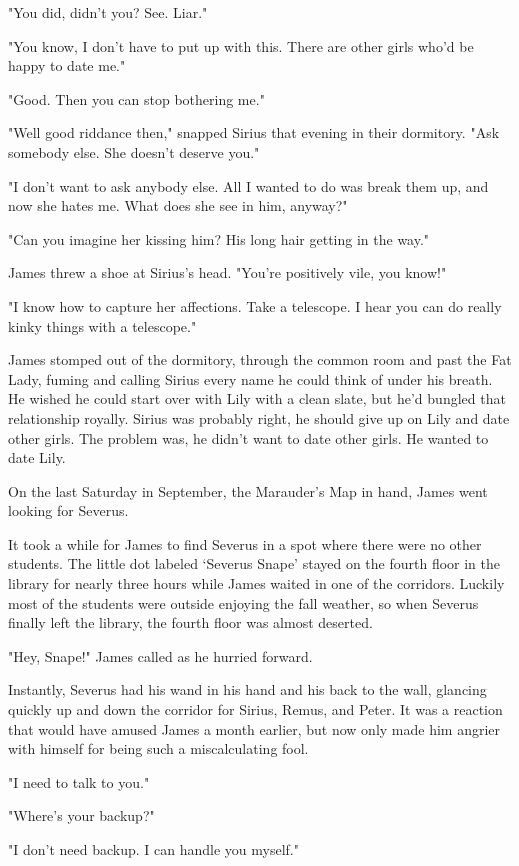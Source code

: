 "You did, didn't you? See. Liar."

"You know, I don't have to put up with this. There are other girls who'd be happy to date me."

"Good. Then you can stop bothering me."

"Well good riddance then," snapped Sirius that evening in their dormitory. "Ask somebody else. She doesn't deserve you."

"I don't want to ask anybody else. All I wanted to do was break them up, and now she hates me. What does she see in him, anyway?"

"Can you imagine her kissing him? His long hair getting in the way."

James threw a shoe at Sirius's head. "You're positively vile, you know!"

"I know how to capture her affections. Take a telescope. I hear you can do really kinky things with a telescope."

James stomped out of the dormitory, through the common room and past the Fat Lady, fuming and calling Sirius every name he could think of under his breath. He wished he could start over with Lily with a clean slate, but he'd bungled that relationship royally. Sirius was probably right, he should give up on Lily and date other girls. The problem was, he didn't want to date other girls. He wanted to date Lily.

On the last Saturday in September, the Marauder's Map in hand, James went looking for Severus.

It took a while for James to find Severus in a spot where there were no other students. The little dot labeled `Severus Snape' stayed on the fourth floor in the library for nearly three hours while James waited in one of the corridors. Luckily most of the students were outside enjoying the fall weather, so when Severus finally left the library, the fourth floor was almost deserted.

"Hey, Snape!" James called as he hurried forward.

Instantly, Severus had his wand in his hand and his back to the wall, glancing quickly up and down the corridor for Sirius, Remus, and Peter. It was a reaction that would have amused James a month earlier, but now only made him angrier with himself for being such a miscalculating fool.

"I need to talk to you."

"Where's your backup?"

"I don't need backup. I can handle you myself."

